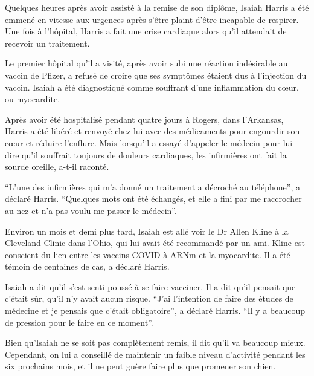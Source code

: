 Quelques heures après avoir assisté à la remise de son diplôme, Isaiah Harris a
été emmené en vitesse aux urgences après s'être plaint d'être incapable de
respirer. Une fois à l'hôpital, Harris a fait une crise cardiaque alors qu'il
attendait de recevoir un traitement.

Le premier hôpital qu'il a visité, après avoir subi une réaction indésirable au
vaccin de Pfizer, a refusé de croire que ses symptômes étaient dus à l'injection
du vaccin. Isaiah a été diagnostiqué comme souffrant d'une inflammation du cœur,
ou myocardite.

Après avoir été hospitalisé pendant quatre jours à Rogers, dans l'Arkansas,
Harris a été libéré et renvoyé chez lui avec des médicaments pour engourdir son
cœur et réduire l'enflure. Mais lorsqu'il a essayé d'appeler le médecin pour lui
dire qu'il souffrait toujours de douleurs cardiaques, les infirmières ont fait
la sourde oreille, a-t-il raconté.

“L'une des infirmières qui m'a donné un traitement a décroché au téléphone”, a
déclaré Harris. “Quelques mots ont été échangés, et elle a fini par me
raccrocher au nez et n'a pas voulu me passer le médecin”.

Environ un mois et demi plus tard, Isaiah est allé voir le Dr Allen Kline à la
Cleveland Clinic dans l'Ohio, qui lui avait été recommandé par un ami. Kline est
conscient du lien entre les vaccins COVID à ARNm et la myocardite. Il a été
témoin de centaines de cas, a déclaré Harris.

Isaiah a dit qu'il s'est senti poussé à se faire vacciner. Il a dit qu'il
pensait que c'était sûr, qu'il n'y avait aucun risque. “J'ai l'intention de
faire des études de médecine et je pensais que c'était obligatoire”, a déclaré
Harris. “Il y a beaucoup de pression pour le faire en ce moment”.

Bien qu'Isaiah ne se soit pas complètement remis, il dit qu'il va beaucoup
mieux. Cependant, on lui a conseillé de maintenir un faible niveau d'activité
pendant les six prochains mois, et il ne peut guère faire plus que promener son
chien.

